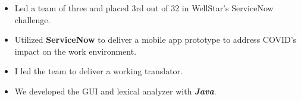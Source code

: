 \documentclass[10pt,a4paper,ragged2e,withhyper]{altacv}
\begin{document}
\begin{paracol}{2}

\begin{itemize}
\item Led a team of three and placed 3rd out of 32 in WellStar’s ServiceNow challenge. 
\item Utilized \textbf{ServiceNow} to deliver a mobile app prototype to address COVID’s impact on the work environment.
\end{itemize}

\divider


\begin{itemize}
\item I led the team to deliver a working translator. 
\item We developed the GUI and lexical analyzer with \textbf{\textit{Java}}.
\end{itemize}










\end{paracol}
\end{document}
